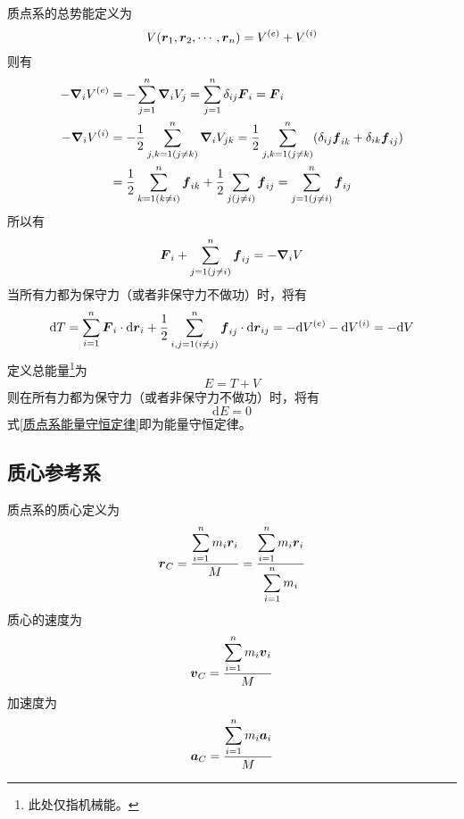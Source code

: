 质点系的总势能定义为
\begin{equation}
	V(\boldsymbol{r}_1,\boldsymbol{r}_2,\cdots,\boldsymbol{r}_n) = V^{(e)} + V^{(i)}
\end{equation}
则有
\begin{align*}
	-\boldsymbol{\nabla}_i V^{(e)} & = -\sum_{j=1}^n \boldsymbol{\nabla}_i V_j = \sum_{j=1}^n \delta_{ij} \boldsymbol{F}_i = \boldsymbol{F}_i \\
	-\boldsymbol{\nabla}_i V^{(i)} & = -\frac12 \sum_{j,k=1(j \neq k)}^n \boldsymbol{\nabla}_i V_{jk} = \frac12 \sum_{j,k=1(j\neq k)}^n (\delta_{ij} \boldsymbol{f}_{ik} + \delta_{ik} \boldsymbol{f}_{ij}) \\
	& = \frac12 \sum_{k=1(k\neq i)}^n \boldsymbol{f}_{ik} + \frac12 \sum_{j(j\neq i)} \boldsymbol{f}_{ij} = \sum_{j=1(j\neq i)}^n \boldsymbol{f}_{ij}
\end{align*}
所以有
\begin{equation}
	\boldsymbol{F}_i + \sum_{j=1(j\neq i)}^n \boldsymbol{f}_{ij} = -\boldsymbol{\nabla}_i V
\end{equation}
当所有力都为保守力（或者非保守力不做功）时，将有
\begin{equation}
	\mathrm{d} T = \sum_{i=1}^n \boldsymbol{F}_i \cdot \mathrm{d} \boldsymbol{r}_i + \frac12 \sum_{i,j=1(i\neq j)}^n \boldsymbol{f}_{ij} \cdot \mathrm{d} \boldsymbol{r}_{ij} = -\mathrm{d} V^{(e)} - \mathrm{d} V^{(i)} = -\mathrm{d} V
\end{equation}
定义{\heiti 总能量}\footnote{此处仅指机械能。}为
\begin{equation}
	E = T+V
\end{equation}
则在所有力都为保守力（或者非保守力不做功）时，将有
\begin{equation}
	\mathrm{d} E = 0
	\label{质点系能量守恒定律}
\end{equation}
式\eqref{质点系能量守恒定律}即为能量守恒定律。

\subsection{质心参考系}

质点系的{\heiti 质心}定义为
\begin{equation}
	\boldsymbol{r}_C = \frac{\displaystyle \sum_{i=1}^n m_i \boldsymbol{r}_i}{M} = \frac{\displaystyle \sum_{i=1}^n m_i \boldsymbol{r}_i}{\displaystyle \sum_{i=1}^n m_i}
\end{equation}
质心的速度为
\begin{equation}
	\boldsymbol{v}_C = \frac{\displaystyle \sum_{i=1}^n m_i \boldsymbol{v}_i}{M}
\end{equation}
加速度为
\begin{equation}
	\boldsymbol{a}_C = \frac{\displaystyle \sum_{i=1}^n m_i \boldsymbol{a}_i}{M}
\end{equation}

